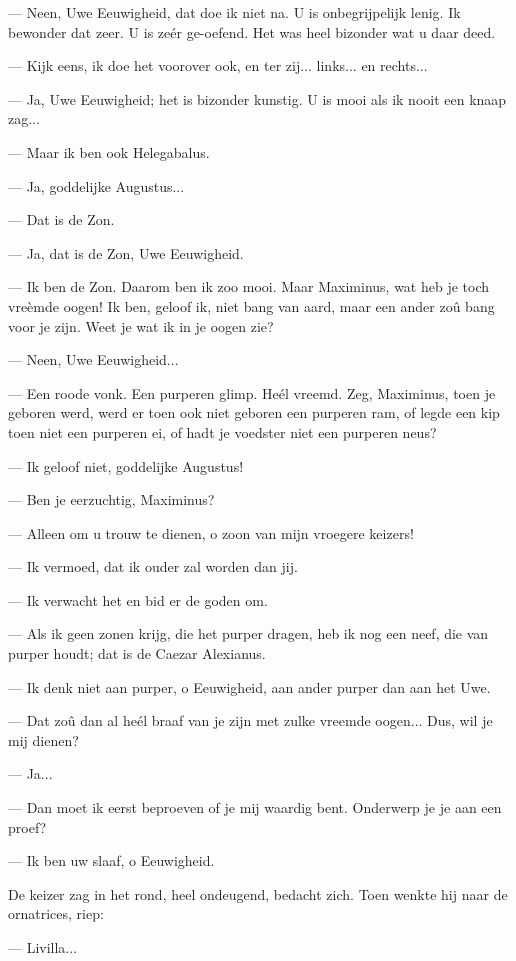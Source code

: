 \documentclass[a4paper, 12pt, oneside, dutch]{article}
\begin{document}
--- Neen, Uwe Eeuwigheid, dat doe ik niet na. U is onbegrijpelijk lenig. Ik bewonder dat zeer. U is zeér ge-oefend. Het was heel bizonder wat u daar deed.

--- Kijk eens, ik doe het voorover ook, en ter zij... links... en rechts...

--- Ja, Uwe Eeuwigheid; het is bizonder kunstig. U is mooi als ik nooit een knaap zag...

--- Maar ik ben ook Helegabalus.

--- Ja, goddelijke Augustus...

--- Dat is de Zon.

--- Ja, dat is de Zon, Uwe Eeuwigheid.

--- Ik ben de Zon. Daarom ben ik zoo mooi. Maar Maximinus, wat heb je toch vreèmde oogen! Ik ben, geloof ik, niet bang van aard, maar een ander zoû bang voor je zijn. Weet je wat ik in je oogen zie?

--- Neen, Uwe Eeuwigheid...

--- Een roode vonk. Een purperen glimp. Heél vreemd. Zeg, Maximinus, toen je geboren werd, werd er toen ook niet geboren een purperen ram, of legde een kip toen niet een purperen ei, of hadt je voedster niet een purperen neus?

--- Ik geloof niet, goddelijke Augustus!

--- Ben je eerzuchtig, Maximinus?

--- Alleen om u trouw te dienen, o zoon van mijn vroegere keizers!

--- Ik vermoed, dat ik ouder zal worden dan jij.

--- Ik verwacht het en bid er de goden om.

--- Als ik geen zonen krijg, die het purper dragen, heb ik nog een neef, die van purper houdt; dat is de Caezar Alexianus.

--- Ik denk niet aan purper, o Eeuwigheid, aan ander purper dan aan het Uwe.

--- Dat zoû dan al heél braaf van je zijn met zulke vreemde oogen... Dus, wil je mij dienen?

--- Ja...

--- Dan moet ik eerst beproeven of je mij waardig bent. Onderwerp je je aan een proef?

--- Ik ben uw slaaf, o Eeuwigheid.

De keizer zag in het rond, heel ondeugend, bedacht zich. Toen wenkte hij naar de ornatrices, riep:

--- Livilla...
\end{document}
